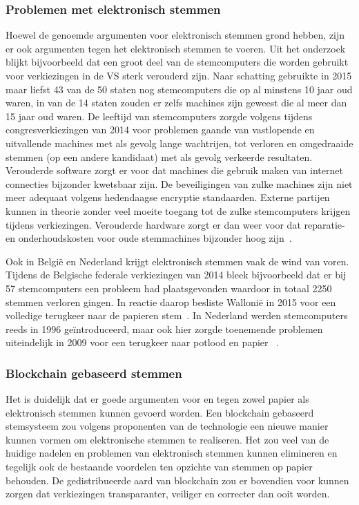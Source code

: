 			\subsubsection{Problemen met elektronisch stemmen}
			Hoewel de genoemde argumenten voor elektronisch stemmen grond hebben, zijn er ook argumenten tegen het elektronisch stemmen te voeren. Uit het onderzoek \cite{Norden2015} blijkt bijvoorbeeld dat een groot deel van de stemcomputers die worden gebruikt voor verkiezingen in de VS sterk verouderd zijn. Naar schatting gebruikte in 2015 maar liefst 43 van de 50 staten nog stemcomputers die op al minstens 10 jaar oud waren, in van de 14 staten zouden er zelfs machines zijn geweest die al meer dan 15 jaar oud waren. De leeftijd van stemcomputers zorgde volgens \cite{Norden2015} tijdens  congresverkiezingen van 2014 voor problemen gaande van vastlopende en uitvallende machines met als gevolg  lange wachtrijen, tot verloren en omgedraaide stemmen (op een andere kandidaat) met als gevolg verkeerde resultaten.
			Verouderde software zorgt er voor dat machines die gebruik maken van internet connecties bijzonder kwetsbaar zijn. De beveiligingen van zulke machines zijn niet meer adequaat volgens hedendaagse encryptie standaarden. Externe partijen kunnen in theorie zonder veel moeite toegang tot de zulke stemcomputers krijgen tijdens verkiezingen. Verouderde hardware zorgt er dan weer voor dat reparatie- en onderhoudskosten voor oude stemmachines bijzonder hoog zijn~\autocite{Norden2015}.
			
			Ook in België en Nederland krijgt elektronisch stemmen vaak de wind van voren. Tijdens de Belgische federale verkiezingen van 2014 bleek bijvoorbeeld dat er bij 57 stemcomputers een probleem had plaatsgevonden waardoor in totaal 2250 stemmen verloren gingen. In reactie daarop besliste Wallonië in 2015 voor een volledige terugkeer naar de papieren stem~\autocite{Maddens2018}.  In Nederland werden stemcomputers reeds in 1996 geïntroduceerd, maar ook hier zorgde toenemende problemen uiteindelijk in 2009 voor een terugkeer naar potlood en papier ~\autocite{Schellevis2018}.
			
			\subsubsection{Blockchain gebaseerd stemmen}
			Het is duidelijk dat er goede argumenten voor en tegen zowel papier als elektronisch stemmen kunnen gevoerd worden. Een blockchain gebaseerd stemsysteem zou volgens proponenten van de technologie een nieuwe manier kunnen vormen om elektronische stemmen te realiseren. Het zou veel van de huidige nadelen en problemen van elektronisch stemmen kunnen elimineren  en tegelijk ook de bestaande voordelen ten opzichte van stemmen op papier behouden. De gedistribueerde aard van blockchain zou er bovendien voor kunnen zorgen dat verkiezingen transparanter, veiliger en correcter dan ooit worden. 
			 
